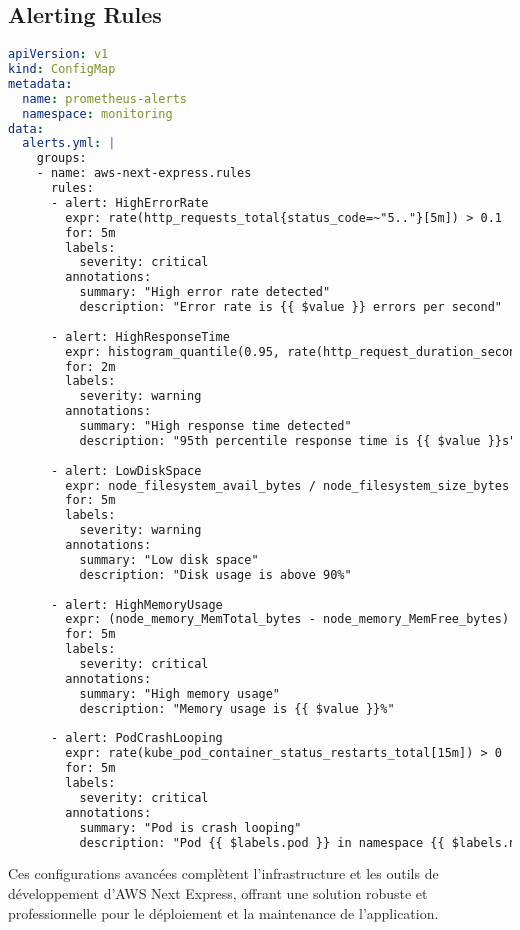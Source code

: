 \subsection{Alerting Rules}

\begin{lstlisting}[language=YAML, caption=monitoring/alerting-rules.yaml]
apiVersion: v1
kind: ConfigMap
metadata:
  name: prometheus-alerts
  namespace: monitoring
data:
  alerts.yml: |
    groups:
    - name: aws-next-express.rules
      rules:
      - alert: HighErrorRate
        expr: rate(http_requests_total{status_code=~"5.."}[5m]) > 0.1
        for: 5m
        labels:
          severity: critical
        annotations:
          summary: "High error rate detected"
          description: "Error rate is {{ $value }} errors per second"
          
      - alert: HighResponseTime
        expr: histogram_quantile(0.95, rate(http_request_duration_seconds_bucket[5m])) > 1
        for: 2m
        labels:
          severity: warning
        annotations:
          summary: "High response time detected"
          description: "95th percentile response time is {{ $value }}s"
          
      - alert: LowDiskSpace
        expr: node_filesystem_avail_bytes / node_filesystem_size_bytes * 100 < 10
        for: 5m
        labels:
          severity: warning
        annotations:
          summary: "Low disk space"
          description: "Disk usage is above 90%"
          
      - alert: HighMemoryUsage
        expr: (node_memory_MemTotal_bytes - node_memory_MemFree_bytes) / node_memory_MemTotal_bytes * 100 > 90
        for: 5m
        labels:
          severity: critical
        annotations:
          summary: "High memory usage"
          description: "Memory usage is {{ $value }}%"
          
      - alert: PodCrashLooping
        expr: rate(kube_pod_container_status_restarts_total[15m]) > 0
        for: 5m
        labels:
          severity: critical
        annotations:
          summary: "Pod is crash looping"
          description: "Pod {{ $labels.pod }} in namespace {{ $labels.namespace }} is restarting frequently"
\end{lstlisting}

Ces configurations avancées complètent l'infrastructure et les outils de développement d'AWS Next Express, offrant une solution robuste et professionnelle pour le déploiement et la maintenance de l'application. 